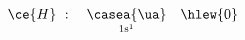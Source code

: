 \documentclass[a4paper, 10pt, final, garamond]{book}
\begin{document}
\begin{gather*}
	\ce{H}~:
	\quad
	\underset{\rm 1s^1}{\casea{\ua}}
	\quad
	\hlew{0}
\end{gather*}
\end{document}
